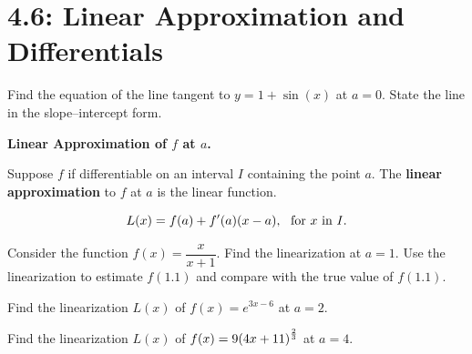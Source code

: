\documentclass[answers]{exam}
\begin{document}
\section{4.6: Linear Approximation and Differentials}
\begin{ex*}
  Find the equation of the line tangent to $y=1+\sin(x)$ at $a=0$. State the line in the slope--intercept form.
\end{ex*}
\begin{flushright}
\end{flushright}
\begin{defn*}
  \textbf{Linear Approximation of $f$ at $a$.}
  
  Suppose $f$ if differentiable on an interval $I$ containing the point $a$. The \textbf{linear approximation} to $f$ at $a$ is the linear function.
  
  $$L(x)=f(a)+f'(a)(x-a),\ \textnormal{ for } x \textnormal{ in } I.$$
\end{defn*}
\pagebreak

\begin{ex*}
  Consider the function $f(x)=\dfrac{x}{x+1}$. Find the linearization at $a=1$. Use the linearization to estimate $f(1.1)$ and compare with the true value of $f(1.1)$.
\end{ex*}

\begin{ex*}
  Find the linearization $L(x)$ of $f(x)=e^{3x-6}$ at $a=2$.
\end{ex*}

\begin{ex*}
  Find the linearization $L(x)$ of $f(x)=9{\left(4x+11\right)}^\frac{2}{3}$ at $a=4$.
\end{ex*}
\end{document}

